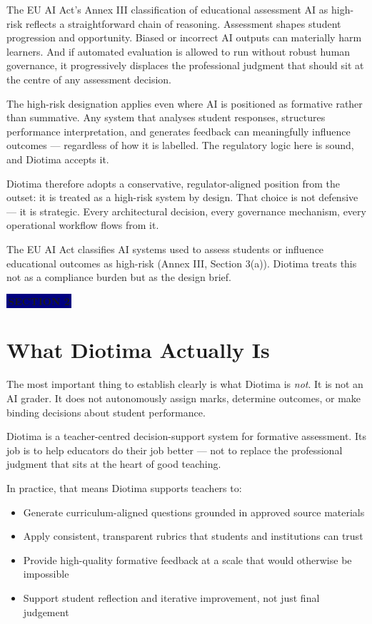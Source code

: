 \documentclass[11pt, a4paper]{article}
\newcommand{\sectiontag}[1]{%
  \vspace{4pt}%
  {\color{white}\colorbox{navy}{\small\bfseries\,#1\,}}%
  \vspace{6pt}%
}
\begin{document}
The EU AI Act's Annex III classification of educational assessment AI as high-risk reflects a straightforward chain of reasoning. Assessment shapes student progression and opportunity. Biased or incorrect AI outputs can materially harm learners. And if automated evaluation is allowed to run without robust human governance, it progressively displaces the professional judgment that should sit at the centre of any assessment decision.

The high-risk designation applies even where AI is positioned as formative rather than summative. Any system that analyses student responses, structures performance interpretation, and generates feedback can meaningfully influence outcomes --- regardless of how it is labelled. The regulatory logic here is sound, and Diotima accepts it.

Diotima therefore adopts a conservative, regulator-aligned position from the outset: it is treated as a high-risk system by design. That choice is not defensive --- it is strategic. Every architectural decision, every governance mechanism, every operational workflow flows from it.

\begin{callout}
The EU AI Act classifies AI systems used to assess students or influence educational outcomes as high-risk (Annex III, Section 3(a)). Diotima treats this not as a compliance burden but as the design brief.
\end{callout}

\sectiontag{SECTION 2}

\section{What Diotima Actually Is}

The most important thing to establish clearly is what Diotima is \textit{not}. It is not an AI grader. It does not autonomously assign marks, determine outcomes, or make binding decisions about student performance.

Diotima is a teacher-centred decision-support system for formative assessment. Its job is to help educators do their job better --- not to replace the professional judgment that sits at the heart of good teaching.

In practice, that means Diotima supports teachers to:

\begin{itemize}
  \item Generate curriculum-aligned questions grounded in approved source materials
  \item Apply consistent, transparent rubrics that students and institutions can trust
  \item Provide high-quality formative feedback at a scale that would otherwise be impossible
  \item Support student reflection and iterative improvement, not just final judgement
\end{itemize}
\end{document}
